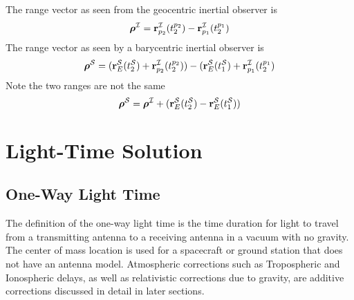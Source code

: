The range vector as seen from the geocentric inertial observer is
%
\begin{equation}
    \boldsymbol{\rho}^\mcI = \mathbf{r}_{p_2}^\mcI(t_2^{p_2}) - \mathbf{r}_{p_1}^\mcI(t_2^{p_1})
\end{equation}
%
The range vector as seen by a barycentric inertial observer is
%
\begin{equation}
    \boldsymbol{\rho}^\mcS = (\mathbf{r}_E^\mcS(t_2^\mcS) + \mathbf{r}_{p_2}^\mcI(t_2^{p_2}))  - ( \mathbf{r}_E^\mcS(t_1^\mcS) +  \mathbf{r}_{p_1}^\mcI(t_2^{p_1})
\end{equation}
%
Note the two ranges are not the same
%
\begin{equation}
    \boldsymbol{\rho}^\mcS = \boldsymbol{\rho}^\mcI + (\mathbf{r}_E^\mcS(t_2^\mcS)  -  \mathbf{r}_E^\mcS(t_1^\mcS) )
\end{equation}

%
%

\section{Light-Time Solution}

\subsection{One-Way Light Time} \label{Sec:OneWayLightTime}

The definition of the one-way light time is the time duration for light to travel from a transmitting antenna to a receiving antenna in a vacuum with no gravity.  The center of mass location is used for a spacecraft or ground station that does not have an antenna model.  Atmospheric corrections such as Tropospheric and Ionospheric delays, as well as relativistic corrections due to gravity, are additive corrections discussed in detail in later sections.

